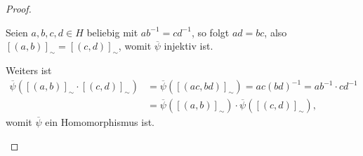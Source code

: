 \begin{proof} {\ }
\begin{enumerate}
        Seien $a,b,c,d \in H$ beliebig mit $a b^{-1} = c d^{-1}$, so folgt $ad = bc$, also $[(a,b)]_\sim = [(c,d)]_\sim$, womit $\overline{\psi}$ injektiv ist.

        Weiters ist
        \begin{align*}
            \overline{\psi}([(a,b)]_\sim \cdot [(c,d)]_\sim) &= \overline{\psi}([(ac,bd)]_\sim) = ac (bd)^{-1} = ab^{-1} \cdot cd^{-1} \\ &= \overline{\psi}([(a,b)]_\sim) \cdot \overline{\psi}([(c,d)]_\sim), 
        \end{align*}
        womit $\overline{\psi}$ ein Homomorphismus ist.
    \end{enumerate}
\end{proof}